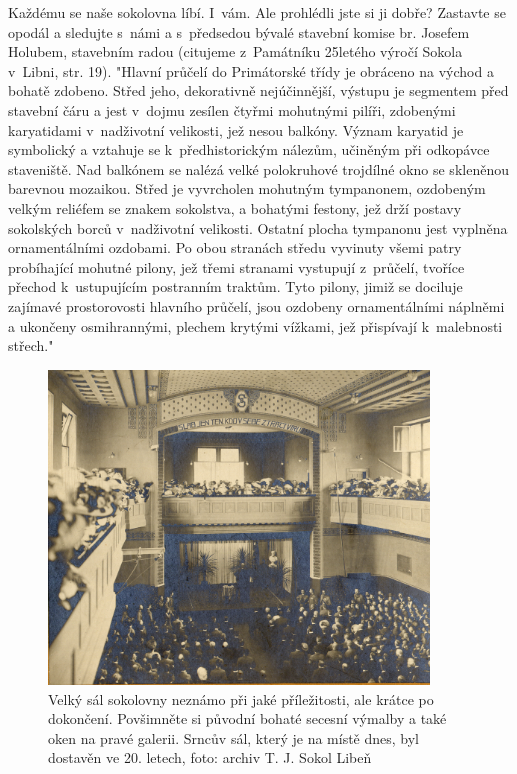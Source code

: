 \documentclass[a5paper, 11pt, twoside]{article}
\begin{document}
Každému se naše sokolovna líbí. I~vám. Ale prohlédli jste si ji dobře?
Zastavte se opodál a sledujte s~námi a s~předsedou bývalé stavební
komise br. Josefem Holubem, stavebním radou (citujeme z~Památníku
25letého výročí Sokola v~Libni, str. 19). "Hlavní průčelí do Primátorské
třídy je obráceno na východ a bohatě zdobeno. Střed jeho, dekorativně
nejúčinnější, výstupu je segmentem před stavební čáru a jest v~dojmu
zesílen čtyřmi mohutnými pilíři, zdobenými karyatidami v~nadživotní
velikosti, jež nesou balkóny. Význam karyatid je symbolický a vztahuje
se k~předhistorickým nálezům, učiněným při odkopávce staveniště. Nad
balkónem se nalézá velké polokruhové trojdílné okno se skleněnou
barevnou mozaikou. Střed je vyvrcholen mohutným tympanonem, ozdobeným
velkým reliéfem se znakem sokolstva, a bohatými festony, jež drží
postavy sokolských borců v~nadživotní velikosti. Ostatní plocha
tympanonu jest vyplněna ornamentálními ozdobami. Po obou stranách středu
vyvinuty všemi patry probíhající mohutné pilony, jež třemi stranami
vystupují z~průčelí, tvoříce přechod k~ustupujícím postranním traktům.
Tyto pilony, jimiž se dociluje zajímavé prostorovosti hlavního průčelí,
jsou ozdobeny ornamentálními náplněmi a ukončeny osmihrannými, plechem
krytými vížkami, jež přispívají k~malebnosti střech."

\begin{figure}[h!]
  \centering 
  \includegraphics[width=0.9\textwidth]{img/20_velky_sal.jpg}
  \caption*{Velký sál sokolovny neznámo při jaké příležitosti, ale krátce po
  dokončení. Povšimněte si původní bohaté secesní výmalby a také oken na
  pravé galerii. Srncův sál, který je na místě dnes, byl dostavěn ve 20.
  letech, foto: archiv T. J. Sokol Libeň}
\end{figure}
\end{document}
